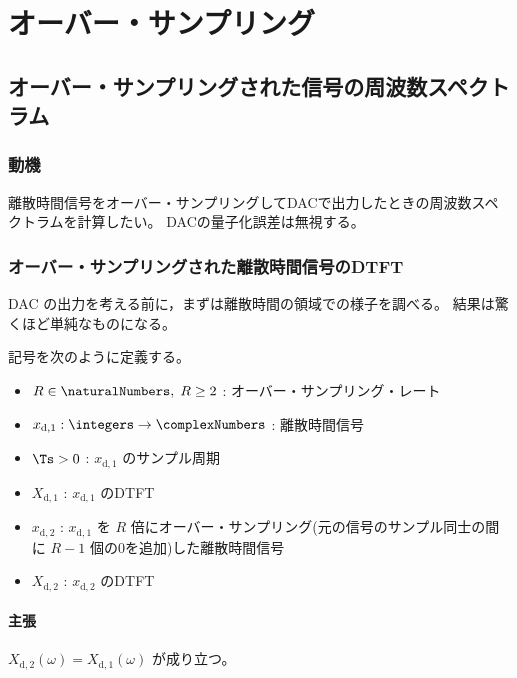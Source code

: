 \chapter{オーバー・サンプリング}
    \section{オーバー・サンプリングされた信号の周波数スペクトラム}
        \newcommand*{\xda}{x_{\text{d},1}}
        \newcommand*{\Xda}{X_{\text{d},1}}
        \newcommand*{\xdb}{x_{\text{d},2}}
        \newcommand*{\Xdb}{X_{\text{d},2}}
        \subsection{動機}
            離散時間信号をオーバー・サンプリングしてDACで出力したときの周波数スペクトラムを計算したい。
            DACの量子化誤差は無視する。
        \subsection{オーバー・サンプリングされた離散時間信号のDTFT}
            DAC の出力を考える前に，まずは離散時間の領域での様子を調べる。
            結果は驚くほど単純なものになる。
            \par
            記号を次のように定義する。
            \begin{itemize}
                \item $R\in\naturalNumbers,\;R\geq 2$ : オーバー・サンプリング・レート
                \item $\xda:\integers\to\complexNumbers$ : 離散時間信号
                \item $\Ts>0$ : $\xda$ のサンプル周期
                \item $\Xda$ : $\xda$ のDTFT
                \item $\xdb$ : $\xda$ を $R$ 倍にオーバー・サンプリング(元の信号のサンプル同士の間に $R-1$ 個の0を追加)した離散時間信号
                \item $\Xdb$ : $\xdb$ のDTFT
            \end{itemize}
            \subsubsection{主張}
                $\Xdb(\omega) = \Xda(\omega)$ が成り立つ。
